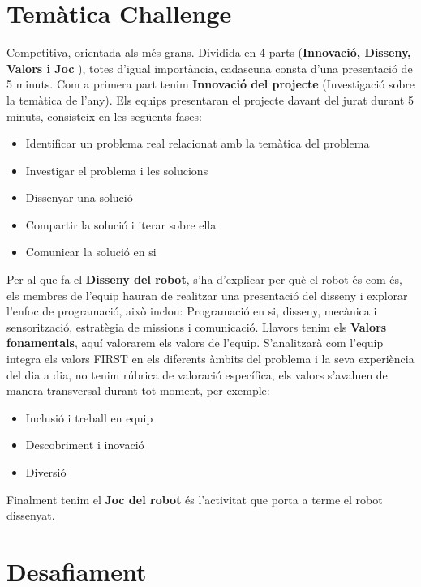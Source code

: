 \documentclass{article}
\begin{document}
\section{Temàtica Challenge}

Competitiva, orientada als més grans. Dividida en 4 parts (\textbf{Innovació, Disseny, Valors i Joc} ), totes d'igual importància, cadascuna consta d’una presentació de 5 minuts.
\hfill \break\hfill \break
Com a primera part tenim \textbf{Innovació del projecte} (Investigació sobre la temàtica de l'any). Els equips presentaran el projecte davant del jurat durant 5 minuts, consisteix en les següents fases:

\begin{itemize}
    \item Identificar un problema real relacionat amb la temàtica del problema
    \item Investigar el problema i les solucions
    \item Dissenyar una solució
    \item Compartir la solució i iterar sobre ella
    \item Comunicar la solució en si
\end{itemize}

Per al que fa el \textbf{Disseny del robot}, s'ha d'explicar per què el robot és com és, els membres de l'equip hauran de realitzar una presentació del disseny i explorar l'enfoc de programació, això inclou: Programació en si, disseny, mecànica i sensorització, estratègia de missions i comunicació.
\hfill \break\hfill \break
Llavors tenim els \textbf{Valors fonamentals}, aquí valorarem els valors de l'equip. S'analitzarà com l'equip integra els valors FIRST en els diferents àmbits del problema i la seva experiència del dia a dia, no tenim rúbrica de valoració específica, els valors s'avaluen de manera transversal durant tot moment, per exemple:

\begin{itemize}
    \item Inclusió i treball en equip
    \item Descobriment i inovació
    \item Diversió
\end{itemize}

Finalment tenim el \textbf{Joc del robot} és l'activitat que porta a terme el robot dissenyat.


\section{Desafiament}
\end{document}
